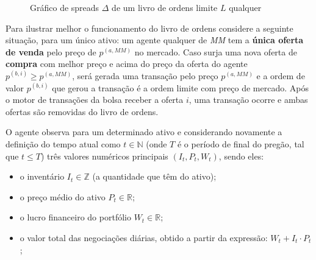 \begin{figure}[H]
	\begin{center}
	\end{center}
	\caption{Gráfico de spreads $\Delta$ de um livro de ordens limite $L$ qualquer}
\end{figure}

Para ilustrar melhor o funcionamento do livro de ordens considere a seguinte situação, para um único ativo: um agente qualquer de \textit{MM} tem a \textbf{única oferta de venda} pelo preço de $p^{(a, MM)}$ no mercado. Caso surja uma nova oferta de \textbf{compra} com melhor preço e acima do preço da oferta do agente $p^{(b, i)} \geq p^{(a, MM)}$, será gerada uma transação pelo preço $p^{(a, MM)}$ e a ordem de valor $p^{(b, i)}$ que gerou a transação é a ordem limite com preço de mercado. Após o motor de transações da bolsa receber a oferta $i$, uma transação ocorre e ambas ofertas são removidas do livro de ordens. 

O agente observa para um determinado ativo e considerando novamente a definição do tempo atual como $t \in \mathbb{N}$ (onde $T$ é o período de final do pregão, tal que $t \leq T$) três valores numéricos principais $(I_{t}, P_{t}, W_{t})$, sendo eles: 
\begin{itemize}
	\item o inventário $I_{t} \in \mathbb{Z}$ (a quantidade que têm do ativo);
	\item o preço médio do ativo $P_{t} \in \mathbb{R}$;
	\item o lucro financeiro do portfólio $W_{t} \in \mathbb{R}$;
	\item o valor total das negociações diárias, obtido a partir da expressão: $W_{t} + I_{t} \cdot P_{t}$;
\end{itemize}

